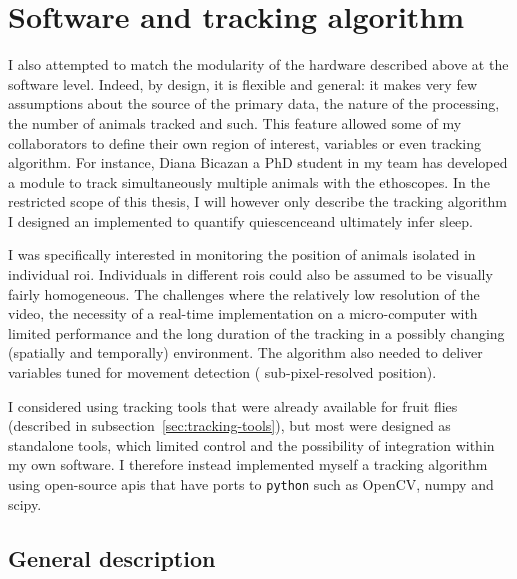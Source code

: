 



\section{Software and tracking algorithm}
\label{sec:tracking}

I also attempted to match the modularity of the hardware described above at the software level.
Indeed, by design, it is flexible and general: it makes very few assumptions about the source of the primary data, the nature of the processing, the number of animals tracked and such. 
This feature allowed some of my collaborators to define their own region of interest, variables or even tracking algorithm. For instance, Diana Bicazan a PhD student in my team has developed a module to track simultaneously multiple animals with the ethoscopes.
In the restricted scope of this thesis, I will however only describe the tracking algorithm I designed an implemented to quantify quiescence\emd{}and ultimately infer sleep.

I was specifically interested in monitoring the position of animals isolated in individual \gls{roi}.
Individuals in different \glspl{roi} could also be assumed to be visually fairly homogeneous.
The challenges where the relatively low resolution of the video, the necessity of a real-time implementation on a micro-computer with limited performance
and the long duration of the tracking in a possibly changing (spatially and temporally) environment.
The algorithm also needed to deliver variables tuned for movement detection (\eg{} sub-pixel-resolved position).

I considered using tracking tools that were already available for fruit flies (described in subsection~\ref{sec:tracking-tools}), but most were designed as standalone tools, which limited control and the possibility of integration within my own software. 
I therefore instead implemented myself a tracking algorithm using open-source \glspl{api} that have ports to \texttt{python} such as OpenCV\cite{bradski_opencv_2000}, numpy\cite{walt_numpy_2011} and scipy\cite{jones_scipy_2001}.

\subsection{General description}

